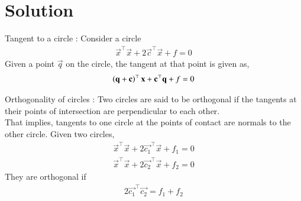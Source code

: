 \documentclass[journal,12pt,twocolumn]{IEEEtran}
\begin{document}
\section{Solution}
\begin{lemma}
Tangent to a circle : Consider a circle 
\begin{align}
    \vec{x}^\top\vec{x} + 2\vec{c}^\top\vec{x} + f = 0 
\end{align}
Given a point $\vec{q}$ on the circle, the tangent at that point is given as,
\begin{align}
    \left(\mathbf{q}+\mathbf{c}\right)^\top\mathbf{x} + \mathbf{c}^\top\mathbf{q} + f = 0 
\end{align}
\end{lemma}
\begin{lemma}
Orthogonality of circles : Two circles are said to be orthogonal if  the tangents at their points of intersection are perpendicular to each other.\\ That implies, tangents to one circle at the points of contact are normals to the other circle. 
Given two circles,
\begin{align}
    \vec{x}^\top\vec{x} + 2\vec{c_1}^\top\vec{x} + f_1 = 0 \label{eq1}\\
    \vec{x}^\top\vec{x} + 2\vec{c_2}^\top\vec{x} + f_2 = 0 \label{eq2}
\end{align}
They are orthogonal if
\begin{align}
    2\vec{c_1}^\top\vec{c_2} = f_1 + f_2 \label{condition}
\end{align}
\end{lemma}
\end{document}
